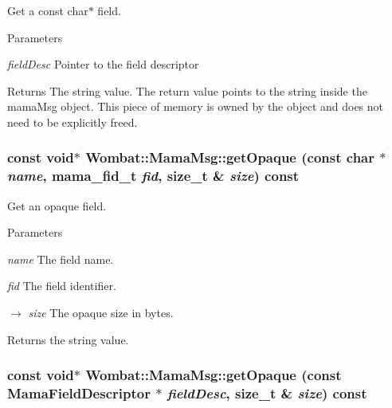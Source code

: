 Get a const char$\ast$ field. 
\begin{DoxyParams}{Parameters}
\item[{\em fieldDesc}]Pointer to the field descriptor \end{DoxyParams}
\begin{DoxyReturn}{Returns}
The string value. The return value points to the string inside the mamaMsg object. This piece of memory is owned by the object and does not need to be explicitly freed. 
\end{DoxyReturn}
\hypertarget{classWombat_1_1MamaMsg_a8e72bf4fef44309b5d2e002c111cf188}{
\subsubsection[{getOpaque}]{\setlength{\rightskip}{0pt plus 5cm}const void$\ast$ Wombat::MamaMsg::getOpaque (const char $\ast$ {\em name}, \/  mama\_\-fid\_\-t {\em fid}, \/  size\_\-t \& {\em size}) const}}
\label{classWombat_1_1MamaMsg_a8e72bf4fef44309b5d2e002c111cf188}


Get an opaque field. 
\begin{DoxyParams}{Parameters}
\item[{\em name}]The field name. \item[{\em fid}]The field identifier. \item[\mbox{$\rightarrow$} {\em size}]The opaque size in bytes. \end{DoxyParams}
\begin{DoxyReturn}{Returns}
the string value. 
\end{DoxyReturn}
\hypertarget{classWombat_1_1MamaMsg_a045f33acd83a78a210124836976c9b8a}{
\subsubsection[{getOpaque}]{\setlength{\rightskip}{0pt plus 5cm}const void$\ast$ Wombat::MamaMsg::getOpaque (const {\bf MamaFieldDescriptor} $\ast$ {\em fieldDesc}, \/  size\_\-t \& {\em size}) const}}
\label{classWombat_1_1MamaMsg_a045f33acd83a78a210124836976c9b8a}


